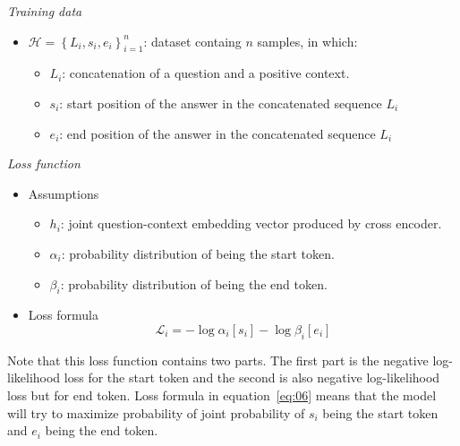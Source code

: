 \documentclass[12pt, sort&compress]{report}
\begin{document}
\par \textit{Training data}
\begin{itemize}
	\item $\mathcal{H} = \left\{ L_i, s_i, e_i\right\}_{i=1}^{n}$: dataset containg $n$ samples, in which:
	\begin{itemize}
		\item $L_i$: concatenation of a question and a positive context.
		\item $s_i$: start position of the answer in the concatenated sequence $L_i$
		\item $e_i$: end position of the answer in the concatenated sequence $L_i$
	\end{itemize}
\end{itemize}
\par \textit{Loss function}
\begin{itemize}
	\item Assumptions
	\begin{itemize}
		\item $h_i$: joint question-context embedding vector produced by cross encoder.
		\item $\alpha_i$: probability distribution of being the start token.
		\item $\beta_i$: probability distribution of being the end token.
	\end{itemize}
	\item Loss formula 
	\begin{equation}\label{eq:06}\mathcal{L}_i = -\log\alpha_i[s_i] - \log\beta_i[e_i]\end{equation}
\end{itemize}
Note that this loss function contains two parts. The first part is the negative log-likelihood loss for the start token and the second is also negative log-likelihood loss but for end token. Loss formula in equation~\eqref{eq:06} means that the model will try to maximize probability of joint probability of $s_i$ being the start token and $e_i$ being the end token.
\end{document}
